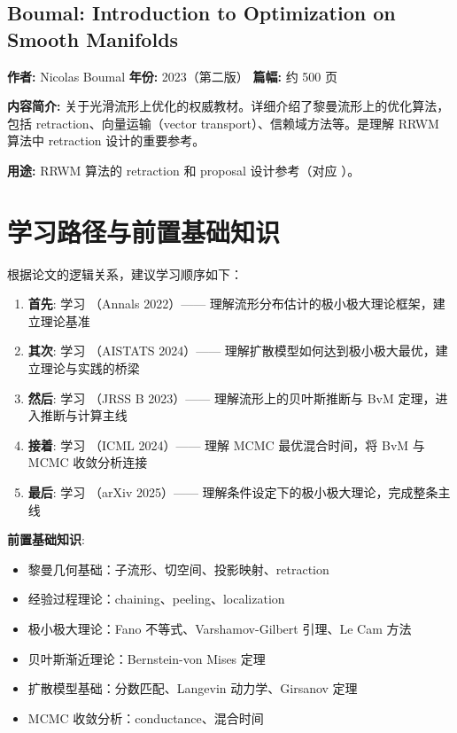 \subsection{Boumal: Introduction to Optimization on Smooth Manifolds}
\textbf{作者:} Nicolas Boumal
\textbf{年份:} 2023（第二版）
\textbf{篇幅:} 约 500 页

\textbf{内容简介:} 关于光滑流形上优化的权威教材。详细介绍了黎曼流形上的优化算法，包括 retraction、向量运输（vector transport）、信赖域方法等。是理解 RRWM 算法中 retraction 设计的重要参考。

\textbf{用途:} RRWM 算法的 retraction 和 proposal 设计参考（对应 \citep{tang2023robust}）。

\section{学习路径与前置基础知识}

根据论文的逻辑关系，建议学习顺序如下：

\begin{enumerate}
    \item \textbf{首先}: 学习 \citep{tang2022minimax}（Annals 2022）——
          理解流形分布估计的极小极大理论框架，建立理论基准
    \item \textbf{其次}: 学习 \citep{tang2024diffusion}（AISTATS 2024）——
          理解扩散模型如何达到极小极大最优，建立理论与实践的桥梁
    \item \textbf{然后}: 学习 \citep{tang2023robust}（JRSS B 2023）——
          理解流形上的贝叶斯推断与 BvM 定理，进入推断与计算主线
    \item \textbf{接着}: 学习 \citep{tang2024mala}（ICML 2024）——
          理解 MCMC 最优混合时间，将 BvM 与 MCMC 收敛分析连接
    \item \textbf{最后}: 学习 \citep{tang2025regression}（arXiv 2025）——
          理解条件设定下的极小极大理论，完成整条主线
\end{enumerate}

\textbf{前置基础知识}:
\begin{itemize}
    \item 黎曼几何基础：子流形、切空间、投影映射、retraction
    \item 经验过程理论：chaining、peeling、localization
    \item 极小极大理论：Fano 不等式、Varshamov-Gilbert 引理、Le Cam 方法
    \item 贝叶斯渐近理论：Bernstein-von Mises 定理
    \item 扩散模型基础：分数匹配、Langevin 动力学、Girsanov 定理
    \item MCMC 收敛分析：conductance、混合时间
\end{itemize}


